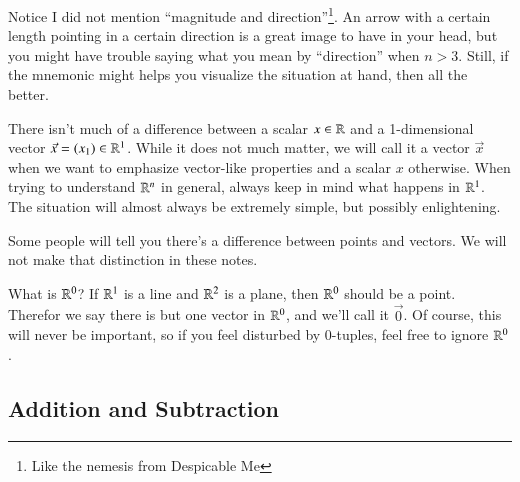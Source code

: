 \begin{Remark}
  Notice I did not mention ``magnitude and direction''\footnote{Like the nemesis from Despicable Me}.  
  An arrow with a certain length pointing in a certain direction is a great image to have in your head, 
  but you might have trouble saying what you mean by ``direction'' when $n>3$.  
  Still, if the mnemonic might helps you visualize the situation at hand, then all the better.
\end{Remark}

\begin{Remark}
  There isn't much of a difference between a scalar $x\in \mathbb{R}$ and a 1-dimensional vector $\vec{x}=(x_1)\in \mathbb{R}^1$.  
  While it does not much matter, we will call it a vector $\vec{x}$ when we want to emphasize vector-like properties and a scalar $x$ otherwise.  
  When trying to understand $\mathbb{R}^n$ in general, always keep in mind what happens in $\mathbb{R}^1$.  The situation will almost always be extremely simple, but possibly enlightening.  
\end{Remark}

\begin{Remark}
  Some people will tell you there's a difference between points and vectors.  We will not make that distinction in these notes.  
\end{Remark}

\begin{UnimportantRemark}
  What is $\mathbb{R}^0$?  
  If $\mathbb{R}^1$ is a line and $\mathbb{R}^2$ is a plane, then $\mathbb{R}^0$ should be a point.  
  Therefor we say there is but one vector in $\mathbb{R}^0$, and we'll call it $\vec{0}$.  
  Of course, this will never be important, so if you feel disturbed by 0-tuples, feel free to ignore $\mathbb{R}^0$.  
\end{UnimportantRemark}

\subsection{Addition and Subtraction}

